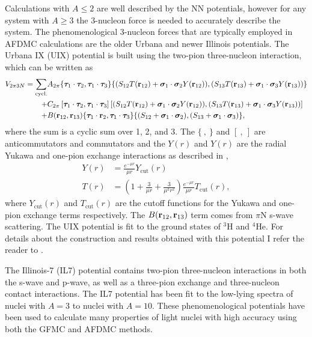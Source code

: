 Calculations with $A\le2$ are well described by the NN potentials, however for any system with $A\ge3$ the 3-nucleon force is needed to accurately describe the system. The phenomenological 3-nucleon forces that are typically employed in AFDMC calculations are the older Urbana and newer Illinois potentials. The Urbana IX (UIX) potential is built using the two-pion three-nucleon interaction, which can be written as
\begin{equation}
\begin{split}
   V_{2\pi3N} = \sum\limits_\text{cycl.} &A_{2\pi}\{\bm{\tau}_1\cdot\bm{\tau}_2,\bm{\tau}_1\cdot\bm{\tau}_3\} \{(S_{12}T(\mathbf{r}_{12})+\bm{\sigma}_1\cdot\bm{\sigma}_2 Y(\mathbf{r}_{12})),(S_{13}T(\mathbf{r}_{13})+\bm{\sigma}_1\cdot\bm{\sigma}_3 Y(\mathbf{r}_{13}))\} \\
      + &C_{2\pi}\left[\bm{\tau}_1\cdot\bm{\tau}_2,\bm{\tau}_1\cdot\bm{\tau}_3\right] \left[(S_{12}T(\mathbf{r}_{12})+\bm{\sigma}_1\cdot\bm{\sigma}_2 Y(\mathbf{r}_{12})),(S_{13}T(\mathbf{r}_{13})+\bm{\sigma}_1\cdot\bm{\sigma}_3 Y(\mathbf{r}_{13}))\right] \\
      + &B(\mathbf{r}_{12},\mathbf{r}_{13})\{\bm{\tau}_1\cdot\mathbf{r}_2,\bm{\tau}_1\cdot\bm{\tau}_3\}\{(S_{12}+\bm{\sigma}_1\cdot\bm{\sigma}_2),(S_{13}+\bm{\sigma}_1\cdot\bm{\sigma}_3)\},
\end{split}
\end{equation}
where the sum is a cyclic sum over 1, 2, and 3. The $\{~,~\}$ and $[~,~]$ are anticommutators and commutators and the $Y(r)$ and $Y(r)$ are the radial Yukawa and one-pion exchange interactions as described in \cite{carlson1983},
\begin{align}
   Y(r) &= \frac{e^{-\mu r}}{\mu r} Y_\text{cut}(r) \\
   T(r) &= \left(1+\frac{3}{\mu r} + \frac{3}{\mu^2 r^2}\right)\frac{e^{-\mu r}}{\mu r} T_\text{cut}(r),
\end{align}
where $Y_\text{cut}(r)$ and $T_\text{cut}(r)$ are the cutoff functions for the Yukawa and one-pion exchange terms respectively. The $B(\mathbf{r}_{12},\mathbf{r}_{13})$ term comes from $\pi$N s-wave scattering. The UIX potential is fit to the ground states of $^3$H and $^4$He. For details about the construction and results obtained with this potential I refer the reader to \cite{carlson1983, pudliner1996, pudliner1997}.

The Illinois-7 (IL7) potential \cite{pieper2001} contains two-pion three-nucleon interactions in both the s-wave and p-wave, as well as a three-pion exchange and three-nucleon contact interactions. The IL7 potential has been fit to the low-lying spectra of nuclei with $A=3$ to nuclei with $A=10$. These phenomenological potentials have been used to calculate many properties of light nuclei with high accuracy using both the GFMC and AFDMC methods.

